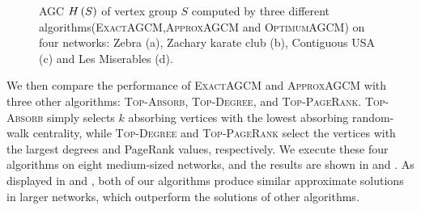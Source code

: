 \documentclass[10pt,journal,compsoc,twocolumn,twoside]{IEEEtran}
\begin{document}
\begin{figure}[!t]
    \caption{AGC \(H\left(S\right)\) of vertex group \(S\) computed by three different algorithms(\textsc{ExactAGCM},\textsc{ApproxAGCM} and \textsc{OptimumAGCM}) on four networks: Zebra (a), Zachary karate club (b), Contiguous USA (c) and Les Miserables (d).\label{pic:compare-effect-optimum}}
\end{figure}

We then compare the performance of \textsc{ExactAGCM} and \textsc{ApproxAGCM} with three other algorithms: \textsc{Top-Absorb}, \textsc{Top-Degree}, and \textsc{Top-PageRank}.
\textsc{Top-Absorb} simply selects \(k\) absorbing vertices with the lowest absorbing random-walk centrality, while \textsc{Top-Degree} and \textsc{Top-PageRank} select the vertices with the largest degrees and PageRank values, respectively.
We execute these four algorithms on eight medium-sized networks, and the results are shown in  and .
As displayed in  and , both of our algorithms produce similar approximate solutions in larger networks, which outperform the solutions of other algorithms.
\end{document}
